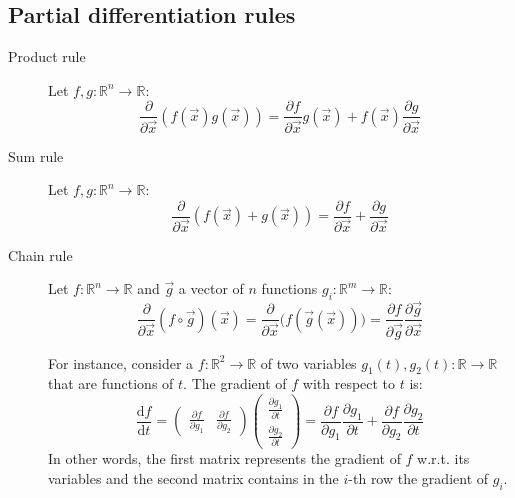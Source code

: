 \subsection{Partial differentiation rules}
\begin{description}
    \item[Product rule] 
        Let $f, g: \mathbb{R}^n \rightarrow \mathbb{R}$:
        \[ 
            \frac{\partial}{\partial \vec{x}} (f(\vec{x})g(\vec{x})) = 
                \frac{\partial f}{\partial \vec{x}} g(\vec{x}) + f(\vec{x}) \frac{\partial g}{\partial \vec{x}}
        \]
    \item[Sum rule] 
        Let $f, g: \mathbb{R}^n \rightarrow \mathbb{R}$:
        \[
            \frac{\partial}{\partial \vec{x}} (f(\vec{x}) + g(\vec{x})) =
                \frac{\partial f}{\partial \vec{x}} + \frac{\partial g}{\partial \vec{x}}
        \]
    \item[Chain rule] 
        Let $f: \mathbb{R}^n \rightarrow \mathbb{R}$ and $\vec{g}$ a vector of $n$ functions $g_i: \mathbb{R}^m \rightarrow \mathbb{R}$:
        \[
            \frac{\partial}{\partial \vec{x}} (f \circ \vec{g})(\vec{x}) = 
                \frac{\partial}{\partial \vec{x}} \Big( f(\vec{g}(\vec{x})) \Big) =
                \frac{\partial f}{\partial \vec{g}} \frac{\partial \vec{g}}{\partial \vec{x}}
        \]

        For instance, consider a $f: \mathbb{R}^2 \rightarrow \mathbb{R}$ of two variables 
        $g_1(t), g_2(t): \mathbb{R} \rightarrow \mathbb{R}$ that are functions of $t$. 
        The gradient of $f$ with respect to $t$ is:
        \[
            \frac{\text{d}f}{\text{d}t} = 
            \begin{pmatrix}
                \frac{\partial f}{\partial g_1} & \frac{\partial f}{\partial g_2}
            \end{pmatrix}
            \begin{pmatrix}
                \frac{\partial g_1}{\partial t} \\ \frac{\partial g_2}{\partial t}
            \end{pmatrix}
            = \frac{\partial f}{\partial g_1} \frac{\partial g_1}{\partial t} + \frac{\partial f}{\partial g_2} \frac{\partial g_2}{\partial t}
        \]
        In other words, the first matrix represents the gradient of $f$ w.r.t. its variables and 
        the second matrix contains in the $i$-th row the gradient of $g_i$.


\end{description}
